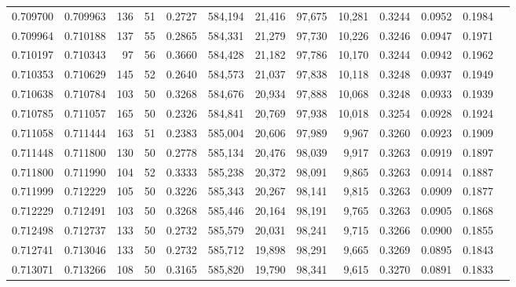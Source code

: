 \begin{tabular}{rrrrrrrrrrrrr}
0.709700 & 0.709963 &   136 &  51 &                                     0.2727 & 584,194 &  21,416 &  97,675 &  10,281 & 0.3244 & 0.0952 & 0.1984 \\
0.709964 & 0.710188 &   137 &  55 &                                     0.2865 & 584,331 &  21,279 &  97,730 &  10,226 & 0.3246 & 0.0947 & 0.1971 \\
0.710197 & 0.710343 &    97 &  56 &                                     0.3660 & 584,428 &  21,182 &  97,786 &  10,170 & 0.3244 & 0.0942 & 0.1962 \\
0.710353 & 0.710629 &   145 &  52 &                                     0.2640 & 584,573 &  21,037 &  97,838 &  10,118 & 0.3248 & 0.0937 & 0.1949 \\
0.710638 & 0.710784 &   103 &  50 &                                     0.3268 & 584,676 &  20,934 &  97,888 &  10,068 & 0.3248 & 0.0933 & 0.1939 \\
0.710785 & 0.711057 &   165 &  50 &                                     0.2326 & 584,841 &  20,769 &  97,938 &  10,018 & 0.3254 & 0.0928 & 0.1924 \\
0.711058 & 0.711444 &   163 &  51 &                                     0.2383 & 585,004 &  20,606 &  97,989 &   9,967 & 0.3260 & 0.0923 & 0.1909 \\
0.711448 & 0.711800 &   130 &  50 &                                     0.2778 & 585,134 &  20,476 &  98,039 &   9,917 & 0.3263 & 0.0919 & 0.1897 \\
0.711800 & 0.711990 &   104 &  52 &                                     0.3333 & 585,238 &  20,372 &  98,091 &   9,865 & 0.3263 & 0.0914 & 0.1887 \\
0.711999 & 0.712229 &   105 &  50 &                                     0.3226 & 585,343 &  20,267 &  98,141 &   9,815 & 0.3263 & 0.0909 & 0.1877 \\
0.712229 & 0.712491 &   103 &  50 &                                     0.3268 & 585,446 &  20,164 &  98,191 &   9,765 & 0.3263 & 0.0905 & 0.1868 \\
0.712498 & 0.712737 &   133 &  50 &                                     0.2732 & 585,579 &  20,031 &  98,241 &   9,715 & 0.3266 & 0.0900 & 0.1855 \\
0.712741 & 0.713046 &   133 &  50 &                                     0.2732 & 585,712 &  19,898 &  98,291 &   9,665 & 0.3269 & 0.0895 & 0.1843 \\
0.713071 & 0.713266 &   108 &  50 &                                     0.3165 & 585,820 &  19,790 &  98,341 &   9,615 & 0.3270 & 0.0891 & 0.1833 \\

\end{tabular}

